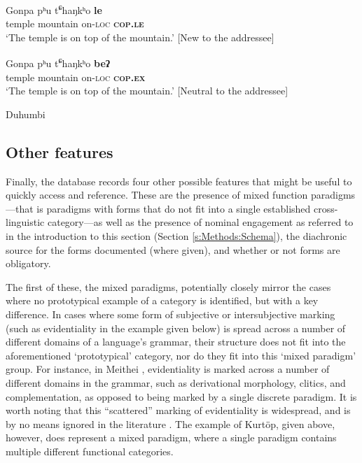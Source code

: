 \begin{exe}
\ex \label{e:Methods:Duhumbi}
\begin{xlist}
\ex 
\gll Gonpa pʰu t\textsuperscript{ɕ}haŋkʰo \textbf{le} \\
temple mountain on-\textsc{loc} \textbf{\textsc{cop.le}} \\
\glt `The temple is on top of the mountain.' [New to the addressee]

\ex 
\gll Gonpa pʰu t\textsuperscript{ɕ}haŋkʰo \textbf{beʔ} \\
temple mountain on-\textsc{loc} \textbf{\textsc{cop.ex}} \\
\glt `The temple is on top of the mountain.' [Neutral to the addressee]
\end{xlist}
Duhumbi \cite[Kho-Bwa: India,][408, notes in relation to addressee added by me]{Bodt2020}
\end{exe}

\subsection{Other features}\label{ss:Methods:Others}
Finally, the database records four other possible features that might be useful to quickly access and reference. These are the presence of mixed function paradigms---that is paradigms with forms that do not fit into a single established cross-linguistic category---as well as the presence of nominal engagement as referred to in the introduction to this section (Section \ref{s:Methods:Schema}), the diachronic source for the forms documented (where given), and whether or not forms are obligatory.

The first of these, the mixed paradigms, potentially closely mirror the cases where no prototypical example of a category is identified, but with a key difference. In cases where some form of subjective or intersubjective marking (such as evidentiality in the example given below) is spread across a number of different domains of a language's grammar, their structure does not fit into the aforementioned `prototypical' category, nor do they fit into this `mixed paradigm' group. For instance, in Meithei \cite[295]{Chelliah1997}, evidentiality is marked across a number of different domains in the grammar, such as derivational morphology, clitics, and complementation, as opposed to being marked by a single discrete paradigm. It is worth noting that this ``scattered'' marking of evidentiality is widespread, and is by no means ignored in the literature \cite[23]{Aikhenvald2014}. The example of Kurtöp, given above, however, does represent a mixed paradigm, where a single paradigm contains multiple different functional categories.

